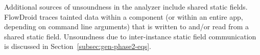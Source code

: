 {Additional sources of unsoundness in the analyzer include shared static fields. 
FlowDroid traces tainted data within a component (or within an entire app, depending on command line arguments) that is written to and/or read from a shared static field. 
Unsoundness due to inter-instance static field communication is discussed in Section~\ref{subsec:gen-phase2-eqs}. 

}
